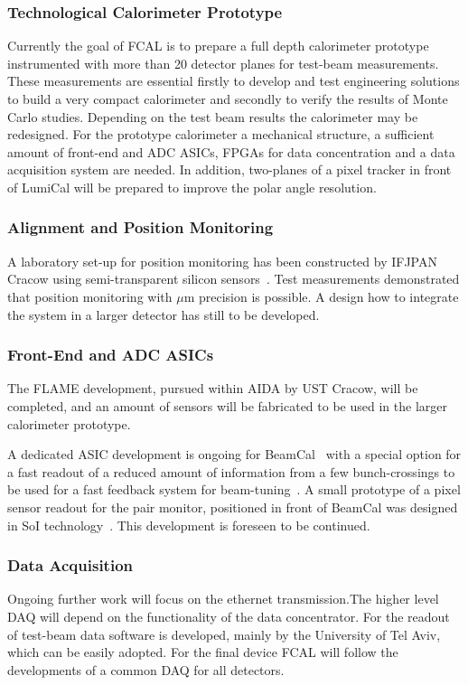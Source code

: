 \subsubsection{Technological Calorimeter Prototype}

Currently the goal of FCAL is to prepare a full depth calorimeter prototype instrumented with more than 20
detector planes for test-beam measurements. These measurements
are essential firstly to develop and test engineering solutions to build a very compact calorimeter and
secondly to verify the results of Monte Carlo studies. Depending on the test beam
results the calorimeter may be redesigned.
For the prototype calorimeter
a mechanical structure, a sufficient amount of front-end and ADC ASICs, FPGAs for
data concentration and
a data acquisition system are needed. In addition, 
two-planes of a pixel tracker in front of LumiCal will be prepared to improve the polar angle resolution.

\subsubsection{Alignment and Position Monitoring }

A laboratory set-up for position monitoring has been constructed by IFJPAN Cracow using semi-transparent
silicon sensors~\cite{EUDETREPORT-2008-05}. Test measurements demonstrated that position monitoring 
with $\mu$m precision is possible. A design how to integrate the system in a larger detector has still to be developed. 

\subsubsection{Front-End and ADC ASICs}

The FLAME development, pursued within AIDA by UST Cracow, will be completed, and an amount of sensors will be fabricated
to be used in the larger calorimeter prototype.

A dedicated ASIC development is ongoing for BeamCal~\cite{6200898}
with a special option for a fast readout of a reduced amount of
information from a few bunch-crossings to be used for a fast feedback system for beam-tuning~\cite{1748-0221-3-10-P10004}.
A small prototype of a pixel sensor readout for the pair monitor, positioned in front of BeamCal was designed in SoI
technology~\cite{Sato201153}. This development is foreseen to be continued.

\subsubsection{Data Acquisition}

Ongoing further work will focus on the ethernet transmission.The higher level DAQ will depend on the functionality of the 
data concentrator. For the readout of test-beam data software is developed, mainly by the University of Tel Aviv,
which can be easily adopted. For the final device FCAL will follow the developments of a common DAQ for all detectors.
